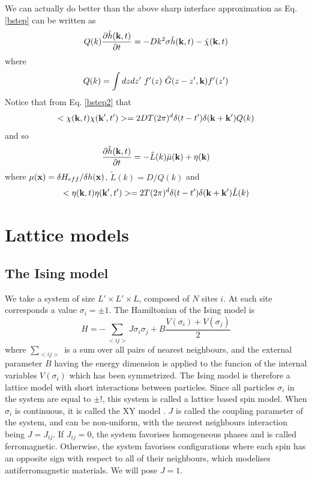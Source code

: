We can actually do better than the above sharp interface approximation as Eq. \eqref{bstep} can be written as
\begin{equation}
Q(k)\frac{\partial\tilde h({\bf k},t)}{\partial t} = -Dk^2\sigma \tilde h({\bf k},t) - \tilde \chi({\bf k},t)
\label{bstep2}
\end{equation}
where 
\begin{equation}
Q(k)= \int dzdz' \ f'(z)\ \tilde G(z-z',{\bf k}) f'(z')
\end{equation}
Notice that from Eq. \eqref{bstep2} that
\begin{equation}
< \chi({\bf k},t)\chi({\bf k}',t')> = 2DT(2\pi)^d \delta(t-t') \delta({\bf k}+{\bf k'}) Q(k)\end{equation}
and so 
\begin{equation}
\frac{\partial\tilde h({\bf k},t)}{\partial t}= -\tilde L(k) \tilde \mu({\bf k}) + \eta({\bf k})
\end{equation}
where $\mu({\bf x})=\delta H_{eff}/\delta h({\bf x}) $, $\tilde L(k) = D/Q(k)$ and 
\begin{equation}
< \eta({\bf k},t)\eta({\bf k}',t')> = 2T(2\pi)^d \delta(t-t') \delta({\bf k}+{\bf k'}) \tilde L(k)
\end{equation}

    \section{Lattice models}

    \subsection{The Ising model}


We take a system of size $L'\times L' \times L$, composed of $N$ sites $i$. At each site corresponds a value $\sigma_i =\pm1$. The Hamiltonian of the Ising model is 
\begin{equation}
	H =  - \sum_{<ij>} J \sigma_i \sigma_j + B \frac{V(\sigma_i)+V(\sigma_j)}{2}
	\label{hamil-ising}
\end{equation}
where $\sum_{< ij >}$ is a sum over all pairs of nearest neighbours, and the external parameter $B$ having the energy dimension is applied to the funcion of the internal variables $V(\sigma_i)$ which has been symmetrized. The Ising model\cite{niss_history_2005,niss_history_2009} is therefore a lattice model with short interactions between particles. Since all particles $\sigma_i$ in the system are equal to $\pm!$, this system is called a lattice based spin model. When $\sigma_i$ is continuous, it is called the XY model \cite{gupta_phase_1988}.
$J$ is called the coupling parameter of the system, and can be non-uniform, with the nearest neighbours interaction being $J = J_{ij}$. If $ J_{ij} =0$, the system favorises homogeneous phases and is called ferromagnetic. Otherwise, the system favorises configurations where each spin has an opposite sign with respect to all of their neighbours, which modelises antiferromagnetic materials. We will pose $J=1$.

